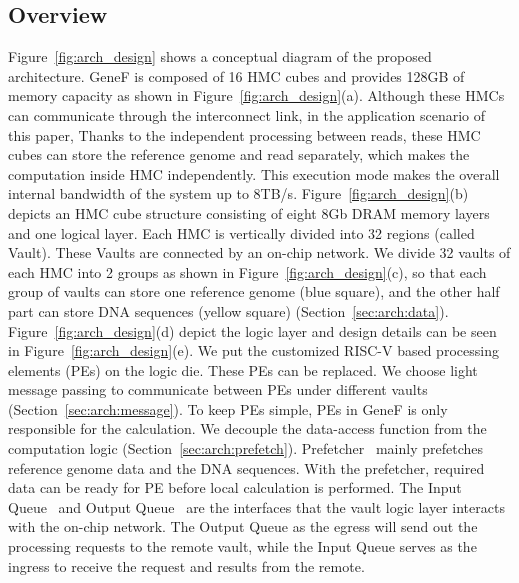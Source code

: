 \documentclass[9pt,conference]{IEEEtran}
\newcommand*\circled[1]{\tikz[baseline=(char.base)]{
		\node[shape=circle,fill,inner sep=0.5pt] (char) {\textcolor{white}{#1}};}}
\begin{document}
\subsection{Overview}
\label{sec:arch:overview}
Figure~\ref{fig:arch_design} shows a conceptual diagram of the proposed architecture. GeneF is composed of 16 HMC cubes and provides 128GB of memory capacity as shown in Figure~\ref{fig:arch_design}(a). Although these HMCs can communicate through the interconnect link, in the application scenario of this paper, Thanks to the independent processing between reads, these HMC cubes can store the reference genome and read separately, which makes the computation inside HMC independently. This execution mode makes the overall internal bandwidth of the system up to 8TB/s. Figure~\ref{fig:arch_design}(b) depicts an HMC cube structure consisting of eight 8Gb DRAM memory layers and one logical layer. Each HMC is vertically divided into 32 regions (called Vault). These Vaults are connected by an on-chip network. We divide 32 vaults of each HMC into 2 groups as shown in Figure~\ref{fig:arch_design}(c), so that each group of vaults can store one reference genome (blue square), and the other half part can store DNA sequences (yellow square) (Section~\ref{sec:arch:data}). Figure~\ref{fig:arch_design}(d) depict the logic layer and design details can be seen in Figure~\ref{fig:arch_design}(e). We put the customized RISC-V based processing elements (PEs) on the logic die. These PEs can be replaced. We choose light message passing to communicate between PEs under different vaults (Section~\ref{sec:arch:message}). To keep PEs simple, PEs in GeneF is only responsible for the calculation. We decouple the data-access function from the computation logic (Section~\ref{sec:arch:prefetch}).  Prefetcher~\circled{2} mainly prefetches reference genome data and the DNA sequences. With the prefetcher, required data can be ready for PE before local calculation is performed. The Input Queue~\circled{1} and Output Queue~\circled{4} are the interfaces that the vault logic layer interacts with the on-chip network. The Output Queue as the egress will send out the processing requests to the remote vault, while the Input Queue serves as the ingress to receive the request and results from the remote.

\end{document}

